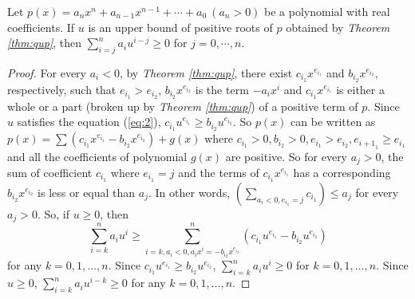 
\begin{theorem}\label{thm:com}
	Let $p(x)=a_nx^n+a_{n-1}x^{n-1}+\cdots+a_0\ (a_n>0)$ be a polynomial with real coefficients. If $u$ is an upper bound of positive roots of $p$ obtained by {\em Theorem \ref{thm:qup}}, then $  \sum_{i=j}^n a_i u^{i-j}\ge0$ for $j=0,\cdots, n$.
	
\end{theorem}
\begin{proof}

	For every $ a_i<0$, by {\em Theorem \ref{thm:qup}}, there exist  $c_{i_1}x^{e_{i_1}}$ and $b_{i_2}x^{e_{i_2}},$  respectively, such that
	$e_{i_1}>e_{i_2}$, $b_{i_2}x^{e_{i_2} }$ is the term $-a_ix^i$
	and $c_{i_1}x^{e_{i_1} }$ is either a whole or a part (broken up by {\em Theorem \ref{thm:qup}}) of a positive term of $p$. Since $u$ satisfies the equation (\ref{eq:2}),
	 $c_{i_1}u^{e_{i_1}}\ge b_{i_2}u^{e_{i_2}}$.
So $p(x)$ can be written as $p(x)=\sum (c_{i_1}x^{e_{i_1}}-b_{i_2}x^{e_{i_2}})+g(x)$ where $c_{i_1}> 0,b_{i_2}>0,e_{i_1}> e_{i_2}, e_{{i+1}_1}\ge e_{i_1} $  and all the coefficients of polynomial $g(x)$ are positive.
	 So for  every  $a_j>0$, the sum of coefficient $c_{i_1}$ where  $e_{i_1}=j$ and  the terms of $c_{i_1}x^{e_{i_1}}$    has a corresponding $ b_{i_2}x^{e_{i_2}}$ is less or equal than $a_j$. In other words,  $\left( \sum_{a_i<0,e_{i_1}=j }c_{i_1} \right)\le a_{j}$ for every  $a_j>0$. So,  if $u\ge0$, then 
	\[\sum_{i=k}^na_iu^i\ge \sum_{i=k,a_i<0, a_ix^i=-b_{i_2}x^{e_{i_2}}  }^n \left( c_{i_1}u^{e_{i_1}}-
		b_{i_2}u^{e_{i_2}} \right) \] for any $k= 0,1,\ldots,n$.  Since  $c_{i_1}u^{e_{i_1}}\ge b_{i_2}u^{e_{i_2}}$, $\sum_{i=k}^na_iu^i\ge 0$ for
	 $k= 0,1,\ldots,n$. Since $u\ge0$,  $\sum_{i=k}^n a_i u^{i-k}\ge0 $ for any  $k= 0,1,\ldots,n$.
\end{proof}


